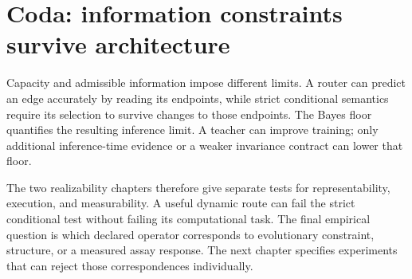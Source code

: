 \section*{Coda: information constraints survive architecture}

Capacity and admissible information impose different limits.  A router can predict an edge
accurately by reading its endpoints, while strict conditional semantics require its selection to
survive changes to those endpoints.  The Bayes floor quantifies the resulting inference limit.
A teacher can improve training; only additional inference-time evidence or a weaker invariance
contract can lower that floor.

The two realizability chapters therefore give separate tests for representability, execution,
and measurability.  A useful dynamic route can fail the strict conditional test without failing
its computational task.  The final empirical question is which declared operator corresponds to
evolutionary constraint, structure, or a measured assay response.  The next chapter specifies
experiments that can reject those correspondences individually.
